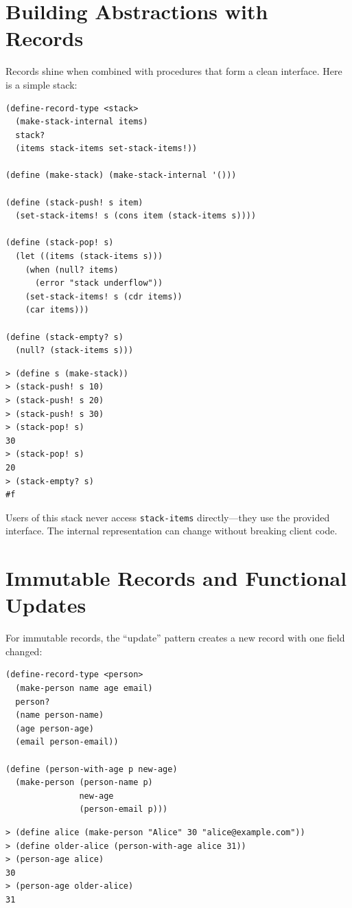 \section{Building Abstractions with Records}

Records shine when combined with procedures that form a clean interface. Here is a simple stack:

\begin{lstlisting}
(define-record-type <stack>
  (make-stack-internal items)
  stack?
  (items stack-items set-stack-items!))

(define (make-stack) (make-stack-internal '()))

(define (stack-push! s item)
  (set-stack-items! s (cons item (stack-items s))))

(define (stack-pop! s)
  (let ((items (stack-items s)))
    (when (null? items)
      (error "stack underflow"))
    (set-stack-items! s (cdr items))
    (car items)))

(define (stack-empty? s)
  (null? (stack-items s)))
\end{lstlisting}

\begin{lstlisting}[style=repl]
> (define s (make-stack))
> (stack-push! s 10)
> (stack-push! s 20)
> (stack-push! s 30)
> (stack-pop! s)
30
> (stack-pop! s)
20
> (stack-empty? s)
#f
\end{lstlisting}

Users of this stack never access \texttt{stack-items} directly---they use the provided interface. The internal representation can change without breaking client code.

\section{Immutable Records and Functional Updates}

For immutable records, the ``update'' pattern creates a new record with one field changed:

\begin{lstlisting}
(define-record-type <person>
  (make-person name age email)
  person?
  (name person-name)
  (age person-age)
  (email person-email))

(define (person-with-age p new-age)
  (make-person (person-name p)
               new-age
               (person-email p)))
\end{lstlisting}

\begin{lstlisting}[style=repl]
> (define alice (make-person "Alice" 30 "alice@example.com"))
> (define older-alice (person-with-age alice 31))
> (person-age alice)
30
> (person-age older-alice)
31
\end{lstlisting}

